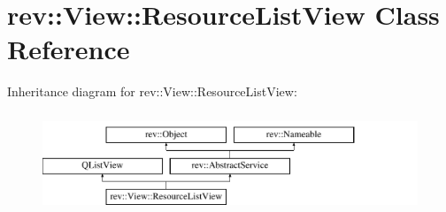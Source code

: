 \hypertarget{classrev_1_1_view_1_1_resource_list_view}{}\section{rev\+::View\+::Resource\+List\+View Class Reference}
\label{classrev_1_1_view_1_1_resource_list_view}
Inheritance diagram for rev\+::View\+::Resource\+List\+View\+:\begin{figure}[H]
\begin{center}
\leavevmode
\includegraphics[height=3.000000cm]{classrev_1_1_view_1_1_resource_list_view}
\end{center}
\end{figure}

